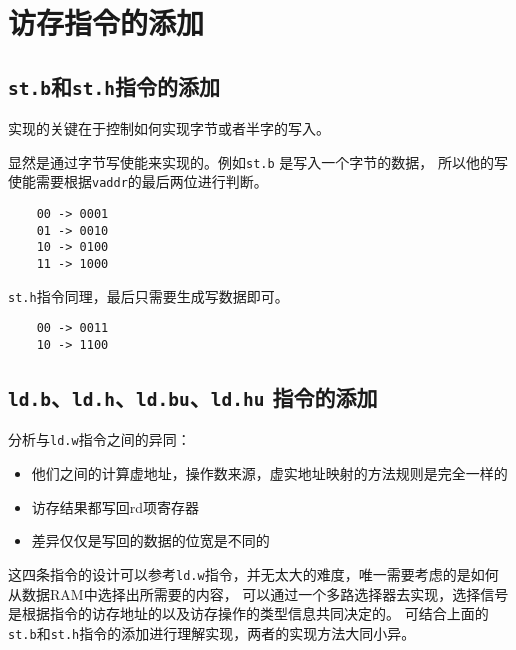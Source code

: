 \section{访存指令的添加}


\subsection{\texttt{st.b}和\texttt{st.h}指令的添加}

实现的关键在于控制如何实现字节或者半字的写入。

显然是通过字节写使能来实现的。例如\texttt{st.b} 是写入一个字节的数据， 所以他的写使能需要根据\texttt{vaddr}的最后两位进行判断。


\begin{verbatim}
    00 -> 0001
    01 -> 0010
    10 -> 0100
    11 -> 1000
\end{verbatim}

\texttt{st.h}指令同理，最后只需要生成写数据即可。

\begin{verbatim}
    00 -> 0011
    10 -> 1100
\end{verbatim}

\subsection{\texttt{ld.b}、\texttt{ld.h}、\texttt{ld.bu}、\texttt{ld.hu} 指令的添加}

分析与\texttt{ld.w}指令之间的异同：
\begin{itemize}
    \item 他们之间的计算虚地址，操作数来源，虚实地址映射的方法规则是完全一样的
    \item 访存结果都写回rd项寄存器
    \item 差异仅仅是写回的数据的位宽是不同的
\end{itemize}

这四条指令的设计可以参考\texttt{ld.w}指令，并无太大的难度，唯一需要考虑的是如何从数据RAM中选择出所需要的内容，
可以通过一个多路选择器去实现，选择信号是根据指令的访存地址的以及访存操作的类型信息共同决定的。
可结合上面的\texttt{st.b}和\texttt{st.h}指令的添加进行理解实现，两者的实现方法大同小异。

